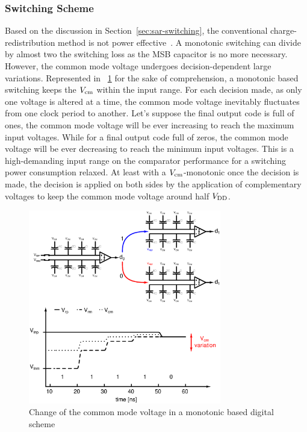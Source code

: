 	\subsubsection{Switching Scheme}        %
Based on the discussion in Section~\ref{sec:sar-switching}, the conventional charge-redistribution method is not power effective~\cite{Ginsburg2005}. A monotonic switching can divide by almost two the switching loss as the MSB capacitor is no more necessary. However, the common mode voltage undergoes decision-dependent large variations. Represented in \figurename~\ref{fig:sar-vcm-change-monotonic} for the sake of comprehension, a monotonic based switching keeps the \(V_{\rm cm} \) within the input range. For each decision made, as only one voltage is altered at a time, the common mode voltage inevitably fluctuates from one clock period to another. Let's suppose the final output code is full of ones, the common mode voltage will be ever increasing to reach the maximum input voltages. While for a final output code full of zeros, the common mode voltage will be ever decreasing to reach the minimum input voltages. This is a high-demanding input range on the comparator performance for a switching power consumption relaxed. At least with a $V_{\rm cm}$-monotonic once the decision is made, the decision is applied on both sides by the application of complementary voltages to keep the common mode voltage around half $V_{\rm DD}$.

\begin{figure}[htp]
	\centering
	\includegraphics[width=0.75\textwidth]{Chapter4/Figs/sar/sar_vcm_monotonic-vcm-change.ps}
	\caption{Change of the common mode voltage in a monotonic based digital scheme}
	\label{fig:sar-vcm-change-monotonic}
\end{figure}

